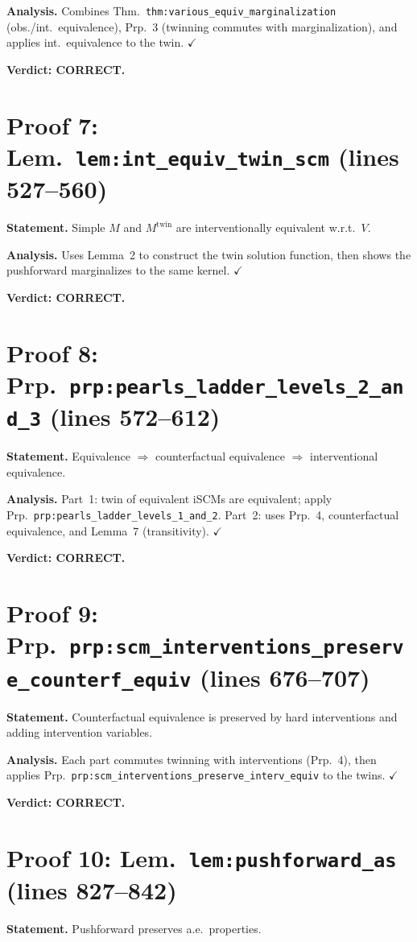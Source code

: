 \documentclass{article}
\begin{document}
\textbf{Analysis.} Combines Thm.\ \texttt{thm:various\_equiv\_marginalization}
(obs./int.\ equivalence), Prp.~3 (twinning commutes with marginalization),
and applies int.\ equivalence to the twin.  $\checkmark$

\textbf{Verdict: CORRECT.}

\section{Proof 7: Lem.\ \texttt{lem:int\_equiv\_twin\_scm} (lines 527--560)}
\textbf{Statement.} Simple $M$ and $M^{\mathrm{twin}}$ are interventionally
equivalent w.r.t.\ $V$.

\textbf{Analysis.} Uses Lemma~2 to construct the twin solution function,
then shows the pushforward marginalizes to the same kernel.  $\checkmark$

\textbf{Verdict: CORRECT.}

\section{Proof 8: Prp.\ \texttt{prp:pearls\_ladder\_levels\_2\_and\_3}
(lines 572--612)}
\textbf{Statement.} Equivalence $\Rightarrow$ counterfactual equivalence
$\Rightarrow$ interventional equivalence.

\textbf{Analysis.} Part~1: twin of equivalent iSCMs are equivalent; apply
Prp.\ \texttt{prp:pearls\_ladder\_levels\_1\_and\_2}.
Part~2: uses Prp.~4, counterfactual equivalence, and Lemma~7 (transitivity).
$\checkmark$

\textbf{Verdict: CORRECT.}

\section{Proof 9: Prp.\ \texttt{prp:scm\_interventions\_preserve\_counterf\_equiv}
(lines 676--707)}
\textbf{Statement.} Counterfactual equivalence is preserved by hard interventions
and adding intervention variables.

\textbf{Analysis.} Each part commutes twinning with interventions (Prp.~4),
then applies Prp.\ \texttt{prp:scm\_interventions\_preserve\_interv\_equiv}
to the twins.  $\checkmark$

\textbf{Verdict: CORRECT.}

\section{Proof 10: Lem.\ \texttt{lem:pushforward\_as} (lines 827--842)}
\textbf{Statement.} Pushforward preserves a.e.\ properties.
\end{document}
